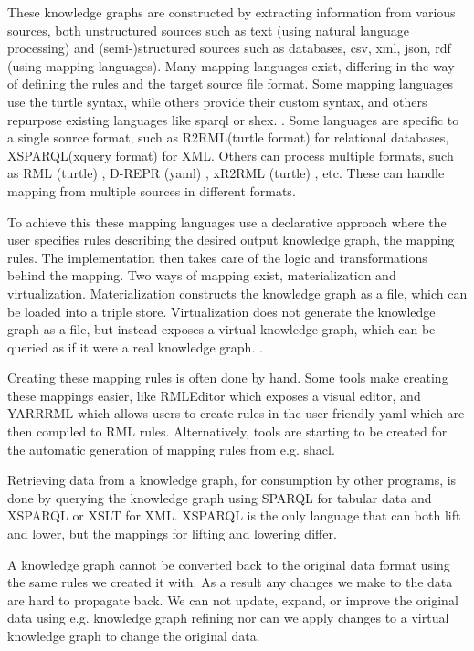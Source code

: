 These knowledge graphs are constructed by extracting information from various sources, both unstructured sources such as text (using natural language processing) and (semi-)structured sources such as databases, \acrshort{csv}, \acrshort{xml}, \acrshort{json}, \acrshort{rdf} (using mapping languages). Many mapping languages exist, differing in the way of defining the rules and the target source file format. Some mapping languages use the turtle syntax, while others provide their custom syntax, and others repurpose existing languages like \acrshort{sparql} or \acrshort{shex}. \citep{VANASSCHE2023100753}. Some languages are specific to a single source format, such as R2RML(turtle format) \citep{Das:12:RRR} for relational databases, XSPARQL(\acrshort{xquery} format) \citep{Bischof2012} for XML. Others can process multiple formats, such as RML (turtle) \citep{dimou_ldow_2014}, D-REPR (\acrshort{yaml}) \citep{d-repr}, xR2RML (turtle) \citep{xR2RML}, etc. These can handle mapping from multiple sources in different formats.

To achieve this these mapping languages use a declarative approach where the user specifies rules describing the desired output knowledge graph, the mapping rules. The implementation then takes care of the logic and transformations behind the mapping. Two ways of mapping exist, materialization and virtualization. Materialization constructs the knowledge graph as a file, which can be loaded into a triple store. Virtualization does not generate the knowledge graph as a file, but instead exposes a virtual knowledge graph, which can be queried as if it were a real knowledge graph. \citep{ontop}.

Creating these mapping rules is often done by hand. Some tools make creating these mappings easier, like RMLEditor \citep{heyvaert_jws_2018} which exposes a visual editor, and YARRRML \citep{10.1007/978-3-319-98192-5_40} which allows users to create rules in the user-friendly \acrshort{yaml} which are then compiled to RML rules. Alternatively, tools are starting to be created for the automatic generation of mapping rules from e.g. \acrshort{shacl}.

Retrieving data from a knowledge graph, for consumption by other programs, is done by querying the knowledge graph using SPARQL \citep{Seaborne:08:SQL} for tabular data and XSPARQL \citep{Bischof2012} or XSLT for XML. XSPARQL is the only language that can both lift and lower, but the mappings for lifting and lowering differ. 

A knowledge graph cannot be converted back to the original data format using the same rules we created it with. As a result any changes we make to the data are hard to propagate back. We can not update, expand, or improve the original data using e.g. knowledge graph refining nor can we apply changes to a virtual knowledge graph to change the original data. 

